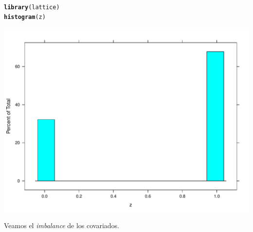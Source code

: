 \documentclass[onesided]{article}\usepackage[]{graphicx}\usepackage[]{color}
\makeatletter
\def\maxwidth{ %
  \ifdim\Gin@nat@width>\linewidth
    \linewidth
  \else
    \Gin@nat@width
  \fi
}
\newcommand{\hlstd}[1]{\textcolor[rgb]{0.345,0.345,0.345}{#1}}%
\newcommand{\hlkwd}[1]{\textcolor[rgb]{0.737,0.353,0.396}{\textbf{#1}}}%
\newenvironment{kframe}{%
 \def\at@end@of@kframe{}%
 \ifinner\ifhmode%
  \def\at@end@of@kframe{\end{minipage}}%
  \begin{minipage}{\columnwidth}%
 \fi\fi%
 \def\FrameCommand##1{\hskip\@totalleftmargin \hskip-\fboxsep
 \colorbox{shadecolor}{##1}\hskip-\fboxsep
     \hskip-\linewidth \hskip-\@totalleftmargin \hskip\columnwidth}%
 \MakeFramed {\advance\hsize-\width
   \@totalleftmargin\z@ \linewidth\hsize
   \@setminipage}}%
 {\par\unskip\endMakeFramed%
 \at@end@of@kframe}
\newenvironment{knitrout}{}{} %
\makeatother
\begin{document}
\begin{knitrout}
\color{fgcolor}\begin{kframe}
\begin{alltt}
\hlkwd{library}\hlstd{(lattice)}
\hlkwd{histogram}\hlstd{(z)}
\end{alltt}
\end{kframe}

{\centering \includegraphics[width=\maxwidth]{figure/sim:2-1} 

}



\end{knitrout}

Veamos el \emph{imbalance} de los covariados.
\end{document}
